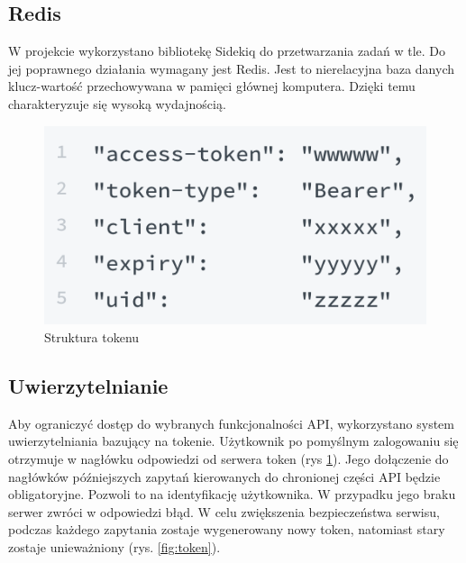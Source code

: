 \documentclass[declaration,shortabstract,polish,inz]{iithesis}
\begin{document}
\subsection{Redis}
W projekcie wykorzystano bibliotekę Sidekiq \cite{sidekiq} do przetwarzania zadań w tle. Do jej poprawnego działania wymagany jest Redis. Jest to nierelacyjna baza danych klucz-wartość przechowywana w pamięci głównej komputera. Dzięki temu charakteryzuje się wysoką wydajnością.

\begin{figure}[H]
    \centering
    \includegraphics{images/token.png}
    \caption{Struktura tokenu}
    \label{fig:token2}
\end{figure}
\subsection{Uwierzytelnianie}
Aby ograniczyć dostęp do wybranych funkcjonalności API, wykorzystano system uwierzytelniania bazujący na tokenie. Użytkownik po pomyślnym zalogowaniu się otrzymuje w nagłówku odpowiedzi od serwera token (rys \ref{fig:token2}). Jego dołączenie do nagłówków późniejszych zapytań kierowanych do chronionej części API będzie obligatoryjne. Pozwoli to na identyfikację użytkownika. W przypadku jego braku serwer zwróci w odpowiedzi błąd. W celu zwiększenia bezpieczeństwa serwisu, podczas każdego zapytania zostaje wygenerowany nowy token, natomiast stary zostaje unieważniony (rys. \ref{fig:token}).
\end{document}
